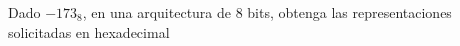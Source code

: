 \documentclass[addpoints]{exam}
\begin{document}
\begin{questions}




 
\question Dado $-173_8$, en una arquitectura de 8 bits, obtenga las
  representaciones solicitadas en hexadecimal

\droptotalpoints %




\end{questions}
\end{document}
